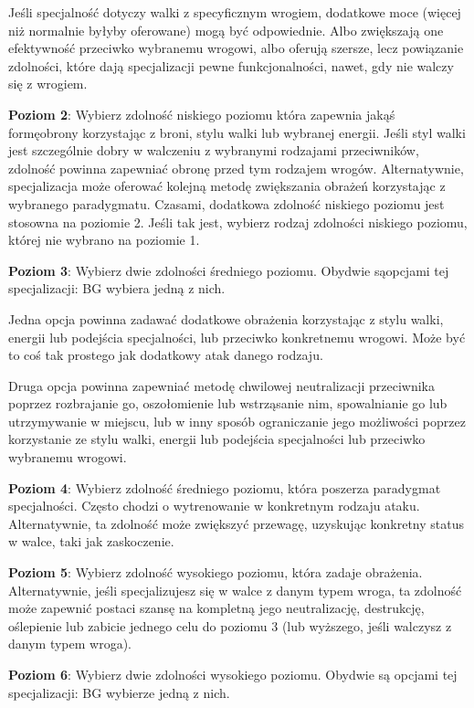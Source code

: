 Jeśli specjalność dotyczy walki z specyficznym wrogiem, dodatkowe moce (więcej niż normalnie byłyby oferowane) mogą być odpowiednie. Albo zwiększają one efektywność przeciwko wybranemu wrogowi, albo oferują szersze, lecz powiązanie zdolności, które dają specjalizacji pewne funkcjonalności, nawet, gdy nie walczy się z wrogiem.

\textbf{Poziom 2}: Wybierz zdolność niskiego poziomu która zapewnia jakąś formęobrony korzystając z broni, stylu walki lub wybranej energii. Jeśli styl walki jest szczególnie dobry w walczeniu z wybranymi rodzajami przeciwników, zdolność powinna zapewniać obronę przed tym rodzajem wrogów. Alternatywnie, specjalizacja może oferować kolejną metodę zwiększania obrażeń korzystając z wybranego paradygmatu.
Czasami, dodatkowa zdolność niskiego poziomu jest stosowna na poziomie 2. Jeśli tak jest, wybierz rodzaj zdolności niskiego poziomu, której nie wybrano na poziomie 1.

\textbf{Poziom 3}: Wybierz dwie zdolności średniego poziomu. Obydwie sąopcjami tej specjalizacji: BG wybiera jedną z nich.

Jedna opcja powinna zadawać dodatkowe obrażenia korzystając z stylu walki, energii lub podejścia specjalności, lub przeciwko konkretnemu wrogowi. Może być to coś tak prostego jak dodatkowy atak danego rodzaju.

Druga opcja powinna zapewniać metodę chwilowej neutralizacji przeciwnika poprzez rozbrajanie go, oszołomienie lub wstrząsanie nim, spowalnianie go lub utrzymywanie w miejscu, lub w inny sposób ograniczanie jego możliwości poprzez korzystanie ze stylu walki, energii lub podejścia specjalności lub przeciwko wybranemu wrogowi.

\textbf{Poziom 4}: Wybierz zdolność średniego poziomu, która poszerza paradygmat specjalności.  Często chodzi o wytrenowanie w konkretnym rodzaju ataku. Alternatywnie, ta zdolność może zwiększyć przewagę, uzyskując konkretny status w walce, taki jak zaskoczenie.

\textbf{Poziom 5}: Wybierz zdolność wysokiego poziomu, która zadaje obrażenia. Alternatywnie, jeśli specjalizujesz się w walce z danym typem wroga, ta zdolność może zapewnić postaci szansę na kompletną jego neutralizację, destrukcję, oślepienie lub zabicie jednego celu do poziomu 3 (lub wyższego, jeśli walczysz z danym typem wroga).

\textbf{Poziom 6}: Wybierz dwie zdolności wysokiego poziomu. Obydwie są opcjami tej specjalizacji: BG wybierze jedną z nich.

